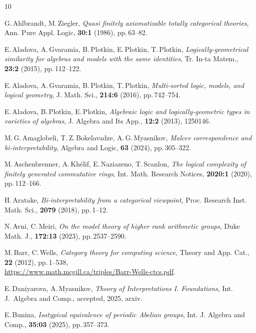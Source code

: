 \documentclass[12pt]{article}
\theoremstyle{definition}
\begin{document}
\begin{thebibliography}{10}

G.\,Ahlbrandt, M.\,Ziegler, {\it Quasi finitely axiomatizable totally categorical theories}, Ann. Pure Appl. Logic, {\bf 30:1} (1986), pp.\,63--82.

E.\,Aladova, A.\,Gvaramia, B.\,Plotkin, E.\,Plotkin, T.\,Plotkin, {\it Logically-geometrical similarity for algebras and models with the same identities}, Tr. In-ta Matem., {\bf 23:2} (2015), pp.\,112--122.

E.\,Aladova, A.\,Gvaramia, B.\,Plotkin, T.\,Plotkin, {\it Multi-sorted logic, models, and logical geometry}, J. Math. Sci., {\bf 214:6} (2016), pp.\,742--754.

E.\,Aladova, B.\,Plotkin, E.\,Plotkin, {\it Algebraic logic and logically-geometric types in varieties of algebras}, J. Algebra and Its App., {\bf 12:2} (2013), 1250146.

M.\,G.\,Amaglobeli, T.\,Z.\,Bokelavadze, 
A.\,G.\,Myasnikov, {\it Malcev correspondence and bi-interpretability}, Algebra and Logic, {\bf 63} (2024), pp.\,305--322.

M.\,Aschenbrenner, A.\,Kh\'elif, E.\,Naziazeno, T.\,Scanlon, {\it The logical complexity of finitely generated commutative rings}, Int. Math. Research Notices, {\bf 2020:1} (2020), pp.\,112--166.

H.\,Aratake, {\it Bi-interpretability from a categorical viewpoint},  Proc. Research Inst. Math. Sci., {\bf 2079} (2018), pp.\,1--12. 

N.\,Avni, C.\,Meiri, {\it On the model theory of higher rank arithmetic groups}, Duke Math. J., {\bf 172:13} (2023), pp.\,2537--2590.

M.\,Barr, C.\,Wells, {\it Category theory for computing science}, Theory and App. Cat., {\bf 22} (2012), pp.\,1--538, \\ \href{https://www.math.mcgill.ca/triples/Barr-Wells-ctcs.pdf}{https://www.math.mcgill.ca/triples/Barr-Wells-ctcs.pdf}.

E.\,Daniyarova, A.\,Myasnikov,
{\it Theory of Interpretations I. Foundations}, Int. J.~Algebra and Comp., accepted, 2025, arxiv.

E.\,Bunina, {\it Isotypical equivalence of periodic Abelian groups}, Int. J. Algebra and Comp., {\bf 35:03} (2025), pp.\,357--373.


\end{thebibliography}
\end{document}
